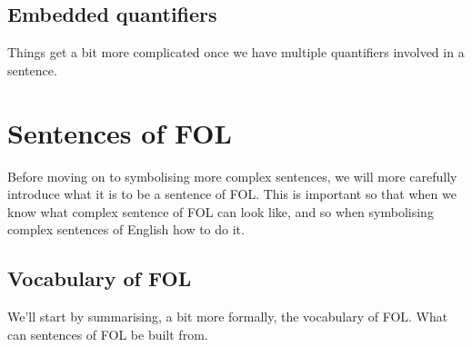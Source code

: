 \section{Embedded quantifiers}


Things get a bit more complicated once we have multiple quantifiers involved in a sentence.



\chapter{Sentences of FOL}\label{s:FOLSentences}
Before moving on to symbolising more complex sentences, we will more carefully introduce what it is to be a sentence of FOL. This is important so that when we know what complex sentence of FOL can look like, and so when symbolising complex sentences of English how to do it. 


\section{Vocabulary of FOL}
We'll start by summarising, a bit more formally, the vocabulary of FOL. What can sentences of FOL be built from. 

